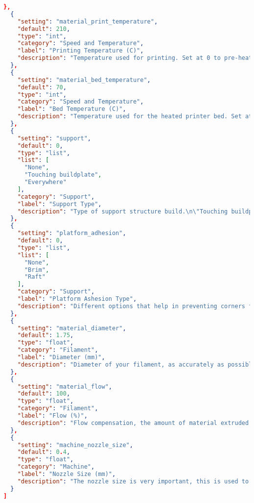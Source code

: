 \begin{lstlisting}[language=json, label={lst:basic}, caption=A full static settings file. There were five more files like this but one is sufficient to show the structure of this code.]
  },
  {
    "setting": "material_print_temperature",
    "default": 210,
    "type": "int",
    "category": "Speed and Temperature",
    "label": "Printing Temperature (C)",
    "description": "Temperature used for printing. Set at 0 to pre-heat yourself.\nFor PLA a value of 210C is usually used.\nFor ABS a value of 230C or higher is required."
  },
  {
    "setting": "material_bed_temperature",
    "default": 70,
    "type": "int",
    "category": "Speed and Temperature",
    "label": "Bed Temperature (C)",
    "description": "Temperature used for the heated printer bed. Set at 0 to pre-heat yourself."
  },
  {
    "setting": "support",
    "default": 0,
    "type": "list",
    "list": [
      "None",
      "Touching buildplate",
      "Everywhere"
    ],
    "category": "Support",
    "label": "Support Type",
    "description": "Type of support structure build.\n\"Touching buildplate\" is the most commonly used support setting.\n\nNone does not do any support.\nTouching buildplate only creates support where the support structure will touch the build platform.\nEverywhere creates support even on top of parts of the model."
  },
  {
    "setting": "platform_adhesion",
    "default": 0,
    "type": "list",
    "list": [
      "None",
      "Brim",
      "Raft"
    ],
    "category": "Support",
    "label": "Platform Ashesion Type",
    "description": "Different options that help in preventing corners from lifting due to warping.\nBrim adds a single layer thick flat area around your object which is easy to cut off afterwards, and it is the recommended option.\nRaft adds a thick raster below the object and a thin interface between this and your object.\n(Note that enabling the brim or raft disables the skirt)"
  },
  {
    "setting": "material_diameter",
    "default": 1.75,
    "type": "float",
    "category": "Filament",
    "label": "Diameter (mm)",
    "description": "Diameter of your filament, as accurately as possible.\nIf you cannot measure this value you will have to calibrate it, a higher number means less extrusion, a smaller number generates more extrusion."
  },
  {
    "setting": "material_flow",
    "default": 100,
    "type": "float",
    "category": "Filament",
    "label": "Flow (%)",
    "description": "Flow compensation, the amount of material extruded is multiplied by this value"
  },
  {
    "setting": "machine_nozzle_size",
    "default": 0.4,
    "type": "float",
    "category": "Machine",
    "label": "Nozzle Size (mm)",
    "description": "The nozzle size is very important, this is used to calculate the line width of the infill, and used to calculate the amount of outside wall lines and thickness for the wall thickness you entered in the print settings."
  }
]
\end{lstlisting}


